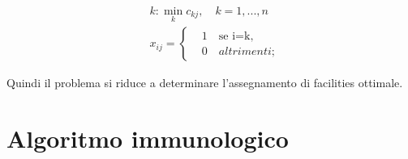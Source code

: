 \documentclass[a4paper,12pt,titlepage,oneside]{article}
\begin{document}
\begin{equation*}
\begin{aligned}
& k:\min_{k}c_{kj}, \quad k = 1,...,n \\
& x_{ij}=\left\{\begin{aligned}
& 1 \quad \text{se i=k},\\ 
& 0 \quad altrimenti;
\end{aligned}\right.
\end{aligned}
\end{equation*}

Quindi il problema si riduce a determinare l'assegnamento di facilities ottimale.



\section{Algoritmo immunologico}
\end{document}
